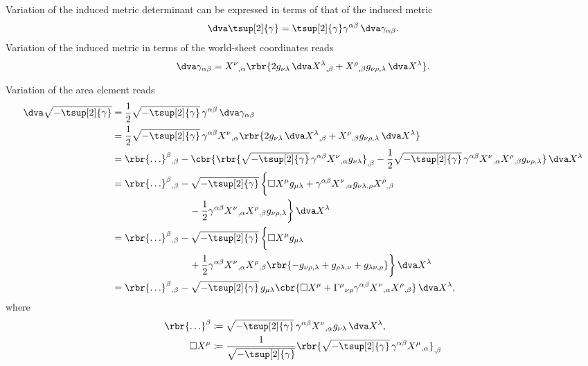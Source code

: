 \documentclass[a4paper,11pt]{article}
\begin{document}
Variation of the induced metric determinant can be expressed in terms of that 
of the induced metric
\begin{align}
\dva \tsup[2]{\gamma} = \tsup[2]{\gamma} \gamma^{\alpha\beta}\,\dva 
	\gamma_{\alpha\beta}.
\end{align}
Variation of the induced metric in terms of the world-sheet coordinates reads 
\begin{align}
\dva \gamma_{\alpha\beta} = X^{\nu}{}_{,\alpha} \rbr{
	2 g_{\nu\lambda}\, \dva X^{\lambda}{}_{,\beta} + 
	X^{\rho}{}_{,\beta} g_{\nu\rho,\lambda}\, \dva X^{\lambda}}.
\end{align}

Variation of the area element reads
\begin{align}
\dva \sqrt{-\tsup[2]{\gamma}} &=
\frac{1}{2} \sqrt{-\tsup[2]{\gamma}}\, \gamma^{\alpha\beta}\,
\dva \gamma_{\alpha\beta}
\nonumber \\
&=
\frac{1}{2} \sqrt{-\tsup[2]{\gamma}}\, \gamma^{\alpha\beta}
X^{\nu}{}_{,\alpha}\rbr{2 g_{\nu\lambda}\, \dva X^{\lambda}{}_{,\beta} + 
	X^{\rho}{}_{,\beta} g_{\nu\rho,\lambda}\, \dva X^{\lambda}}
\nonumber \\
&=
\rbr{\ldots}^{\beta}{}_{,\beta} - \cbr{
\rbr{\sqrt{-\tsup[2]{\gamma}}\, \gamma^{\alpha\beta} 
	X^{\nu}{}_{,\alpha} g_{\nu\lambda}}_{,\beta} - 
\frac{1}{2} \sqrt{-\tsup[2]{\gamma}}\, \gamma^{\alpha\beta} X^{\nu}{}_{,\alpha} 
X^{\rho}{}_{,\beta} g_{\nu\rho,\lambda}}\, \dva X^{\lambda}
\nonumber \\
&=
\rbr{\ldots}^{\beta}{}_{,\beta} - \sqrt{-\tsup[2]{\gamma}}\, \bigg\{
	\square X^{\mu} g_{\mu\lambda} + 
	\gamma^{\alpha\beta} X^{\nu}{}_{,\alpha}
		g_{\nu\lambda,\rho} X^{\rho}{}_{,\beta} 
\nonumber \\
&\qquad\qquad\qquad\qquad -
	\frac{1}{2} \gamma^{\alpha\beta} X^{\nu}{}_{,\alpha} X^{\rho}{}_{,\beta}
		g_{\nu\rho,\lambda} \bigg\}\, \dva X^{\lambda}
\nonumber \\
&=
\rbr{\ldots}^{\beta}{}_{,\beta} - \sqrt{-\tsup[2]{\gamma}}\, \bigg\{
	\square X^{\mu} g_{\mu\lambda} 
\nonumber \\
&\qquad\qquad\qquad\qquad + 
	\frac{1}{2} \gamma^{\alpha\beta} X^{\nu}{}_{,\alpha} X^{\rho}{}_{,\beta}
		\rbr{-g_{\nu\rho,\lambda} + g_{\rho\lambda,\nu} + g_{\lambda\nu,\rho}}
	\bigg\}\, \dva X^{\lambda}
\nonumber \\
&=
\rbr{\ldots}^{\beta}{}_{,\beta} - \sqrt{-\tsup[2]{\gamma}}\, g_{\mu\lambda}
	\cbr{ \square X^{\mu} + 
	\Gamma^{\mu}{}_{\nu\rho} \gamma^{\alpha\beta}
		X^{\nu}{}_{,\alpha} X^{\rho}{}_{,\beta}
	} \, \dva X^{\lambda},
\end{align}
where
\begin{align}
\rbr{\ldots}^{\beta} &\coloneqq \sqrt{-\tsup[2]{\gamma}}\, \gamma^{\alpha\beta}
X^{\nu}{}_{,\alpha} g_{\nu\lambda}\,\dva X^{\lambda},
\\
\square X^{\mu} &\coloneqq
\frac{1}{\sqrt{-\tsup[2]{\gamma}}} \rbr{\sqrt{-\tsup[2]{\gamma}}\, 
	\gamma^{\alpha\beta} X^{\mu}{}_{,\alpha}}_{,\beta}
\end{align}



\printbibliography
\end{document}

